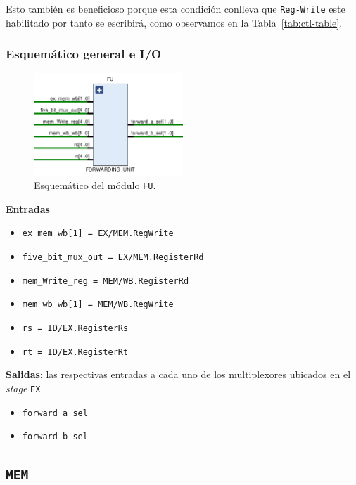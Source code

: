 \documentclass[a4paper]{article}
\begin{document}
Esto también es beneficioso porque esta condición conlleva que \texttt{Reg-Write} este habilitado por tanto se escribirá, como observamos en la Tabla~\ref{tab:ctl-table}.

\subsubsection{Esquemático general e I/O}

\begin{figure}[H]
	\begin{center}				
	\includegraphics[width=0.5\textwidth,center]{TP4_10.png}
  	\caption{Esquemático del módulo \texttt{FU}.}
  	\label{fig:funcionamiento.}
  	\end{center}
\end{figure}

\textbf{Entradas}

\begin{itemize}
	\item \texttt{ex\_mem\_wb[1] = EX/MEM.RegWrite}
	\item \texttt{five\_bit\_mux\_out = EX/MEM.RegisterRd}
	\item \texttt{mem\_Write\_reg = MEM/WB.RegisterRd}
	\item \texttt{mem\_wb\_wb[1] = MEM/WB.RegWrite}
	\item \texttt{rs = ID/EX.RegisterRs}
	\item \texttt{rt = ID/EX.RegisterRt}
\end{itemize}

\textbf{Salidas}: las respectivas entradas a cada uno de los multiplexores ubicados en el \textit{stage} \texttt{EX}.

\begin{itemize}
	\item \texttt{forward\_a\_sel}
	\item \texttt{forward\_b\_sel} 
\end{itemize}

\subsection{\texttt{MEM}}
\end{document}
